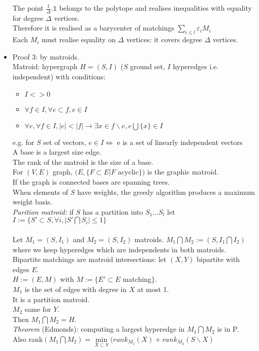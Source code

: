 \documentclass[12pt]{article}
\begin{document}
\begin{itemize}
	The point $\frac{1}{\Delta} . \mathbb{1}$ belongs to the polytope and realises inequalities with equality for degree $\Delta$ vertices.\\
	Therefore it is realised as a barycenter of matchings $\sum\limits_{i \leqslant l} \varepsilon_i M_i$\\
	Each $M_i$ must realise equality on $\Delta$ vertices: it covers degree $\Delta$ vertices.\\
\item Proof 3: by matroids.\\
	Matroid: hypergraph $H=(S,I)$ ($S$ ground set, $I$ hyperedges i.e. independent) with conditions:
	\begin{itemize}
	\item $I <> 0$
	\item $\forall f \in I, \forall e \subset f, e \in I$
	\item $\forall e, \forall f \in I, |e| < |f| \rightarrow \exists x \in f \backslash e, e \bigcup \{x\} \in I$
	\end{itemize}
	e.g. for $S$ set of vectors, $e \in I \Leftrightarrow$ e is a set of linearly independent vectors\\
	A base is a largest size edge.\\
	The rank of the matroid is the size of a base.\\
	For $(V,E)$ graph, $(E, \{F \subset E | F$ acyclic$\})$ is the graphic matroid.\\
	If the graph is connected bases are spanning trees.\\
	When elements of $S$ have weights, the greedy algorithm produces a maximum weight basis.\\
	\emph{Parition matroid:} if $S$ has a partition into $S_1 ... S_l$ let $I := \{ S' \subset S, \forall i, |S' \bigcap S_i| \leqslant 1 \}$\\\\
	Let $M_1=(S,I_1)$ and $M_2=(S,I_2)$ matroids. $M_1 \bigcap M_2 := (S,I_1 \bigcap I_2)$ where we keep hyperedges which are independents in both matroids.\\
	Bipartite matchings are matroid intersections: let $(X,Y)$ bipartite with edges $E$.\\
	$H := (E,M)$ with $M := \{E' \subset E$ matching$\}$.\\
	$M_1$ is the set of edges with degree in $X$ at most 1.\\
	It is a partition matroid.\\
	$M_2$ same for $Y$.\\
	Then $M_1 \bigcap M_2 = H$.\\
	\emph{Theorem} (Edmonds): computing a largest hyperedge in $M_1 \bigcap M_2$ is in P.\\
	Also rank$(M_1 \bigcap M_2) = \min\limits_{X \subset S} (rank_{M_1}(X) + rank_{M_2}(S \backslash X)$\\
\end{itemize}
\end{document}
